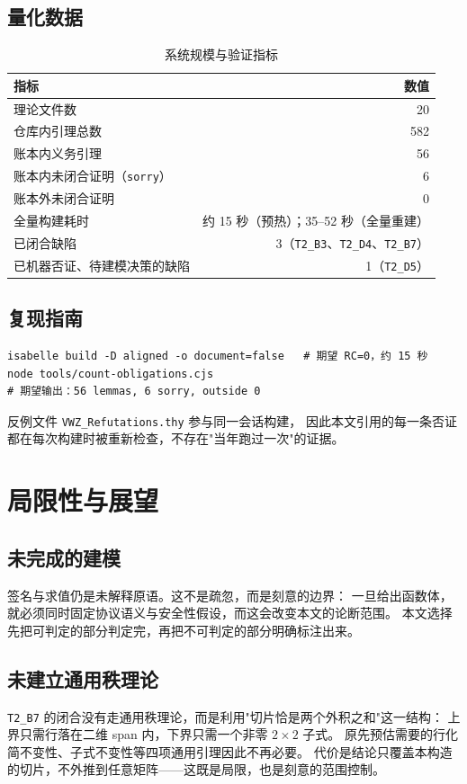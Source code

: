 \documentclass[UTF8,fontset=windows,zihao=-4,a4paper]{ctexart}
\newcommand{\code}[1]{\texttt{#1}}
\begin{document}
\subsection{量化数据}
\begin{table}[htbp]
\centering
\caption{系统规模与验证指标}
\begin{tabular}{lr}
\toprule
指标 & 数值 \\
\midrule
理论文件数 & 20 \\
仓库内引理总数 & 582 \\
账本内义务引理 & 56 \\
账本内未闭合证明（\code{sorry}） & 6 \\
账本外未闭合证明 & 0 \\
全量构建耗时 & 约 15 秒（预热）；35--52 秒（全量重建）\\
已闭合缺陷 & 3（\code{T2\_B3}、\code{T2\_D4}、\code{T2\_B7}）\\
已机器否证、待建模决策的缺陷 & 1（\code{T2\_D5}）\\
\bottomrule
\end{tabular}
\end{table}

\subsection{复现指南}
\begin{verbatim}
isabelle build -D aligned -o document=false   # 期望 RC=0，约 15 秒
node tools/count-obligations.cjs
# 期望输出：56 lemmas, 6 sorry, outside 0
\end{verbatim}
反例文件 \code{VWZ\_Refutations.thy} 参与同一会话构建，
因此本文引用的每一条否证都在每次构建时被重新检查，不存在"当年跑过一次"的证据。

\section{局限性与展望}

\subsection{未完成的建模}
签名与求值仍是未解释原语。这不是疏忽，而是刻意的边界：
一旦给出函数体，就必须同时固定协议语义与安全性假设，而这会改变本文的论断范围。
本文选择先把可判定的部分判定完，再把不可判定的部分明确标注出来。

\subsection{未建立通用秩理论}
\code{T2\_B7} 的闭合没有走通用秩理论，而是利用"切片恰是两个外积之和"这一结构：
上界只需行落在二维 span 内，下界只需一个非零 $2\times2$ 子式。
原先预估需要的行化简不变性、子式不变性等四项通用引理因此不再必要。
代价是结论只覆盖本构造的切片，不外推到任意矩阵——这既是局限，也是刻意的范围控制。
\end{document}
